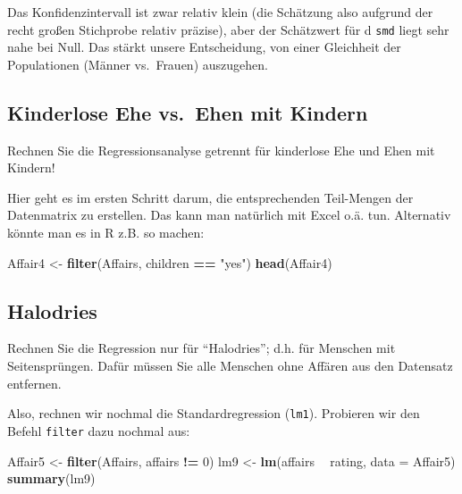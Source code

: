 \documentclass[12pt,ngerman,]{book}
\makeatletter
\newenvironment{Shaded}{\begin{snugshade}}{\end{snugshade}}
\newcommand{\KeywordTok}[1]{\textcolor[rgb]{0.13,0.29,0.53}{\textbf{#1}}}
\newcommand{\DataTypeTok}[1]{\textcolor[rgb]{0.13,0.29,0.53}{#1}}
\newcommand{\DecValTok}[1]{\textcolor[rgb]{0.00,0.00,0.81}{#1}}
\newcommand{\StringTok}[1]{\textcolor[rgb]{0.31,0.60,0.02}{#1}}
\newcommand{\OperatorTok}[1]{\textcolor[rgb]{0.81,0.36,0.00}{\textbf{#1}}}
\newcommand{\NormalTok}[1]{#1}
\newenvironment{kframe}{%
\medskip{}
\setlength{\fboxsep}{.8em}
 \def\at@end@of@kframe{}%
 \ifinner\ifhmode%
  \def\at@end@of@kframe{\end{minipage}}%
  \begin{minipage}{\columnwidth}%
 \fi\fi%
 \def\FrameCommand##1{\hskip\@totalleftmargin \hskip-\fboxsep
 \colorbox{shadecolor}{##1}\hskip-\fboxsep
     \hskip-\linewidth \hskip-\@totalleftmargin \hskip\columnwidth}%
 \MakeFramed {\advance\hsize-\width
   \@totalleftmargin\z@ \linewidth\hsize
   \@setminipage}}%
 {\par\unskip\endMakeFramed%
 \at@end@of@kframe}
\renewenvironment{Shaded}{\begin{kframe}}{\end{kframe}}
\theoremstyle{definition}
\theoremstyle{definition}
\theoremstyle{remark}
\makeatother
\begin{document}
Das Konfidenzintervall ist zwar relativ klein (die Schätzung also
aufgrund der recht großen Stichprobe relativ präzise), aber der
Schätzwert für d \texttt{smd} liegt sehr nahe bei Null. Das stärkt
unsere Entscheidung, von einer Gleichheit der Populationen (Männer
vs.~Frauen) auszugehen.

\subsection{Kinderlose Ehe vs.~Ehen mit
Kindern}\label{kinderlose-ehe-vs.ehen-mit-kindern}

Rechnen Sie die Regressionsanalyse getrennt für kinderlose Ehe und Ehen
mit Kindern!

Hier geht es im ersten Schritt darum, die entsprechenden Teil-Mengen der
Datenmatrix zu erstellen. Das kann man natürlich mit Excel o.ä. tun.
Alternativ könnte man es in R z.B. so machen:

\begin{Shaded}
\begin{Highlighting}[]

\NormalTok{Affair4 <-}\StringTok{ }\KeywordTok{filter}\NormalTok{(Affairs, children }\OperatorTok{==}\StringTok{ "yes"}\NormalTok{)}
\KeywordTok{head}\NormalTok{(Affair4)}
\end{Highlighting}
\end{Shaded}

\subsection{Halodries}\label{halodries}

Rechnen Sie die Regression nur für ``Halodries''; d.h. für Menschen mit
Seitensprüngen. Dafür müssen Sie alle Menschen ohne Affären aus den
Datensatz entfernen.

Also, rechnen wir nochmal die Standardregression (\texttt{lm1}).
Probieren wir den Befehl \texttt{filter} dazu nochmal aus:

\begin{Shaded}
\begin{Highlighting}[]
\NormalTok{Affair5 <-}\StringTok{ }\KeywordTok{filter}\NormalTok{(Affairs, affairs }\OperatorTok{!=}\StringTok{ }\DecValTok{0}\NormalTok{)}
\NormalTok{lm9 <-}\StringTok{ }\KeywordTok{lm}\NormalTok{(affairs }\OperatorTok{~}\StringTok{ }\NormalTok{rating, }\DataTypeTok{data =}\NormalTok{ Affair5)}
\KeywordTok{summary}\NormalTok{(lm9)}
\end{Highlighting}
\end{Shaded}
\end{document}
